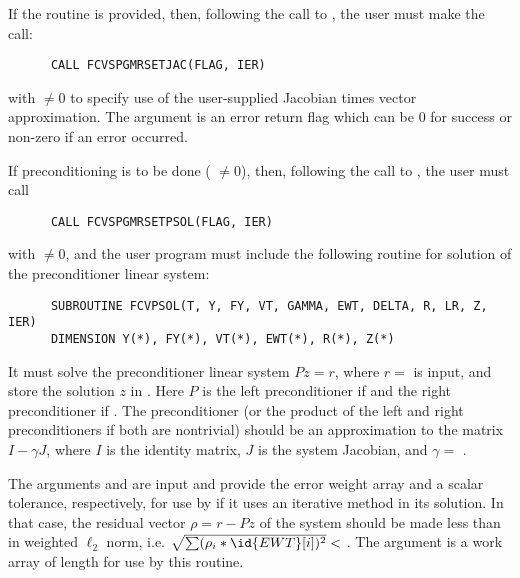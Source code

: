 \begin{Steps}
  If the  routine is provided, then, 
  following the call to , the user must make the call:
\begin{verbatim}
      CALL FCVSPGMRSETJAC(FLAG, IER)
\end{verbatim}
  with  $\neq 0$ to specify use of the user-supplied Jacobian times
  vector approximation.
  The argument  is an error return flag which can be $0$ 
  for success or non-zero if an error occurred.
  
  If preconditioning is to be done ( $\neq 0$), then, following the
  call to , the user must call
\begin{verbatim}
      CALL FCVSPGMRSETPSOL(FLAG, IER)
\end{verbatim}
  with  $\neq 0$, and the user program must include the following routine
  for solution of the preconditioner linear system:
\begin{verbatim}
      SUBROUTINE FCVPSOL(T, Y, FY, VT, GAMMA, EWT, DELTA, R, LR, Z, IER)
      DIMENSION Y(*), FY(*), VT(*), EWT(*), R(*), Z(*)
\end{verbatim}
  It must solve the preconditioner linear system $Pz = r$, where $r =$  
  is input, and store the solution $z$ in . Here $P$ is the left 
  preconditioner if  and the right preconditioner if .  
  The preconditioner (or the product of the left and right preconditioners 
  if both are nontrivial) should be an  approximation to the matrix 
  $I - \gamma J$, where $I$ is the identity matrix, $J$ is the system Jacobian,
  and $\gamma =$ .
  
  The arguments  and  are input and provide the error weight
  array and a scalar tolerance, respectively, for use by  if it uses
  an iterative method in its solution.  In that case, the residual vector
  $\rho = r - Pz$ of the system should be made less than  in weighted
  $\ell_2$ norm, i.e. $\sqrt{\sum(\rho_i * \id{EWT}[i])^2} < $ .
  The argument  is a work array of length  for use by this
  routine.


\end{Steps}
